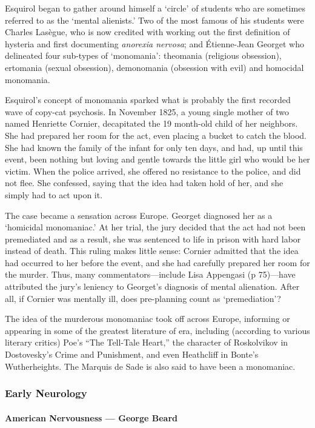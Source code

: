 Esquirol began to gather around himself a `circle' of students who are sometimes referred to as the `mental alienists.' Two of the most famous of his students were Charles Lasègue, who is now credited with working out the first definition of hysteria and first documenting \emph{anorexia nervosa}; and Étienne-Jean Georget who delineated four sub-types of `monomania': theomania (religious obsession), ertomania (sexual obsession), demonomania (obsession with evil) and homocidal monomania.

Esquirol's concept of monomania sparked what is probably the first recorded wave of copy-cat psychosis. In November 1825, a young single mother of two named Henriette Cornier, decapitated the 19 month-old child of her neighbors. She had prepared her room for the act, even placing a bucket to catch the blood. She had known the family of the infant for only ten days, and had, up until this event, been nothing but loving and gentle towards the little girl who would be her victim. When the police arrived, she offered no resistance to the police, and did not flee. She confessed, saying that the idea had taken hold of her, and she simply had to act upon it.

The case became a sensation across Europe. Georget diagnosed her as a `homicidal monomaniac.' At her trial, the jury decided that the act had not been premediated and as a result, she was sentenced to life in prison with hard labor instead of death. This ruling makes little sense: Cornier admitted that the idea had occurred to her before the event, and she had carefully prepared her room for the murder. Thus, many commentators---include Lisa Appengasi (p 75)---have attributed the jury's leniency to Georget's diagnosis of mental alienation. After all, if Cornier was mentally ill, does pre-planning count as `premediation'?

The idea of the murderous monomaniac took off across Europe, informing or appearing in some of the greatest literature of era, including (according to various literary critics) Poe's ``The Tell-Tale Heart,'' the character of Roskolvikov in Dostovesky's Crime and Punishment, and even Heathcliff in Bonte's Wutherheights. The Marquis de Sade is also said to have been a monomaniac.

\subsubsection{Early Neurology}
\label{earlyneurology}

\paragraph{American Nervousness --- George Beard}
\label{americannervousness---georgebeard}

